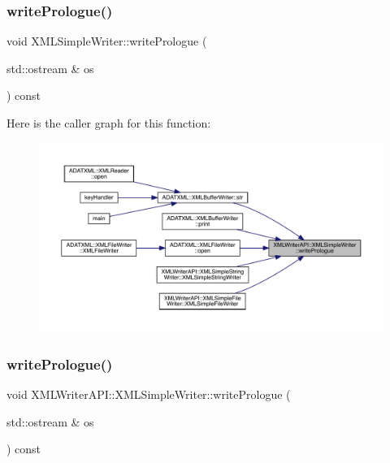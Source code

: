 \mbox{\label{classXMLWriterAPI_1_1XMLSimpleWriter_a09f9ed556d1da6657529363bcee2c61c}} 
\subsubsection{\texorpdfstring{writePrologue()}{writePrologue()}\hspace{0.1cm}{\footnotesize\ttfamily [1/3]}}
{\footnotesize\ttfamily void X\+M\+L\+Simple\+Writer\+::write\+Prologue (\begin{DoxyParamCaption}\item[{std\+::ostream \&}]{os }\end{DoxyParamCaption}) const\hspace{0.3cm}{\ttfamily [protected]}}

Here is the caller graph for this function\+:
\nopagebreak
\begin{figure}[H]
\begin{center}
\leavevmode
\includegraphics[width=350pt]{d5/de1/classXMLWriterAPI_1_1XMLSimpleWriter_a09f9ed556d1da6657529363bcee2c61c_icgraph}
\end{center}
\end{figure}
\mbox{\label{classXMLWriterAPI_1_1XMLSimpleWriter_a1f44b3dd9970ce14e8a4fcf026226028}} 
\subsubsection{\texorpdfstring{writePrologue()}{writePrologue()}\hspace{0.1cm}{\footnotesize\ttfamily [2/3]}}
{\footnotesize\ttfamily void X\+M\+L\+Writer\+A\+P\+I\+::\+X\+M\+L\+Simple\+Writer\+::write\+Prologue (\begin{DoxyParamCaption}\item[{std\+::ostream \&}]{os }\end{DoxyParamCaption}) const\hspace{0.3cm}{\ttfamily [protected]}}

